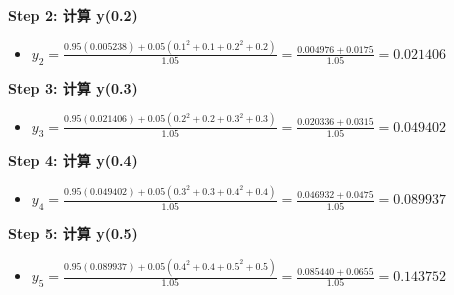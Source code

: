 \documentclass[11pt]{article}
\providecommand{\tightlist}{%
      \setlength{\itemsep}{0pt}\setlength{\parskip}{0pt}}
\begin{document}
\textbf{Step 2: 计算 y(0.2)}

\begin{itemize}
\tightlist
\item
  \(y_2 = \frac{0.95(0.005238) + 0.05(0.1^2+0.1+0.2^2+0.2)}{1.05} = \frac{0.004976 + 0.0175}{1.05} = \mathbf{0.021406}\)
\end{itemize}

\textbf{Step 3: 计算 y(0.3)}

\begin{itemize}
\tightlist
\item
  \(y_3 = \frac{0.95(0.021406) + 0.05(0.2^2+0.2+0.3^2+0.3)}{1.05} = \frac{0.020336 + 0.0315}{1.05} = \mathbf{0.049402}\)
\end{itemize}

\textbf{Step 4: 计算 y(0.4)}

\begin{itemize}
\tightlist
\item
  \(y_4 = \frac{0.95(0.049402) + 0.05(0.3^2+0.3+0.4^2+0.4)}{1.05} = \frac{0.046932 + 0.0475}{1.05} = \mathbf{0.089937}\)
\end{itemize}

\textbf{Step 5: 计算 y(0.5)}

\begin{itemize}
\tightlist
\item
  \(y_5 = \frac{0.95(0.089937) + 0.05(0.4^2+0.4+0.5^2+0.5)}{1.05} = \frac{0.085440 + 0.0655}{1.05} = \mathbf{0.143752}\)
\end{itemize}
\end{document}
